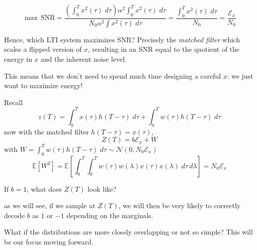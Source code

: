 \documentclass[12pt]{report}
\newcommand{\E}{\mathbb{E}}
\newcommand{\Ec}{\mathcal{E}}
\newcommand{\Nc}{\mathcal{N}}
\begin{document}
\[\max\, \text{SNR} = \frac{\left(\int_0^T x^2(\tau)\; d\tau\right) \alpha^2 \int_0^T x^2(\tau)\; d\tau}{N_0 \alpha^2 \int x^2(\tau)\; d\tau} = \frac{\int_0^T x^2(\tau)\; d\tau}{N_0} = \frac{\Ec_x}{N_0}\]

Hence, which LTI system maximizes SNR? Precisely the \emph{matched filter} which scales a flipped version of $x$, resulting in an SNR equal to the quotient of the energy in $x$ and the inherent noise level. 

This means that we don't need to spend much time designing a careful $x$: we just want to maximize energy! 

Recall 
\[z(T) = \int_0^T x(\tau) h(T - \tau)\; d\tau + \int_0^T w(\tau)h(T - \tau) \; d\tau\]
now with the matched filter $h(T - \tau) = x(\tau)$, 
\[Z(T) = b \Ec_x + W\]
with $W = \int_0^T w(\tau) h(T - \tau)\; d\tau \sim \Nc(0, N_0 \Ec_x)$
\[\E[W^2] = \E[\int_0^T \int_0^T w(\tau) w(\lambda) x(\tau) x(\lambda)\; d\tau \, d\lambda] = N_0 \Ec_x\]

If $b = 1$, what does $Z(T)$ look like? 

\begin{center}
\end{center}

as we will see, if we sample at $Z(T)$, we will then be very likely to correctly decode $b$ as $1$ or $-1$ depending on the marginals. 

What if the distributions are more closely overlapping or not so simple? This will be our focus moving forward.
\end{document}
